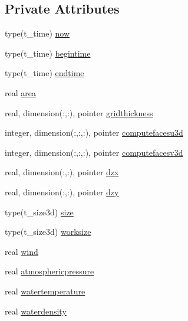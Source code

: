 \subsection*{Private Attributes}
\begin{DoxyCompactItemize}
\item 
type(t\+\_\+time) \mbox{\hyperlink{structmoduleoil_1_1t__external_a5f4b27cf96bcde31445e4983923d03b3}{now}}
\item 
type(t\+\_\+time) \mbox{\hyperlink{structmoduleoil_1_1t__external_a290d5e8747987992b0b1e4456e4d6925}{begintime}}
\item 
type(t\+\_\+time) \mbox{\hyperlink{structmoduleoil_1_1t__external_a17940b1642fb0e3377ba0e292f72ad5c}{endtime}}
\item 
real \mbox{\hyperlink{structmoduleoil_1_1t__external_aa7f8e6e2f4f35995c55819561957f356}{area}}
\item 
real, dimension(\+:,\+:), pointer \mbox{\hyperlink{structmoduleoil_1_1t__external_a727833936225962307a6a21d220c86c4}{gridthickness}}
\item 
integer, dimension(\+:,\+:,\+:), pointer \mbox{\hyperlink{structmoduleoil_1_1t__external_a5f99e02a295e8838de91a65d3ab4ea5b}{computefacesu3d}}
\item 
integer, dimension(\+:,\+:,\+:), pointer \mbox{\hyperlink{structmoduleoil_1_1t__external_a6e5ce4a1a03b16ea13bcbb2910c3d2cb}{computefacesv3d}}
\item 
real, dimension(\+:,\+:), pointer \mbox{\hyperlink{structmoduleoil_1_1t__external_a90da2b437a3d07036ba1b73f725f65ad}{dzx}}
\item 
real, dimension(\+:,\+:), pointer \mbox{\hyperlink{structmoduleoil_1_1t__external_ac1f511a2fad6c8580fcb86d4549be26c}{dzy}}
\item 
type(t\+\_\+size3d) \mbox{\hyperlink{structmoduleoil_1_1t__external_a3a8d7cc9cbad33c0ed7150fc08e25325}{size}}
\item 
type(t\+\_\+size3d) \mbox{\hyperlink{structmoduleoil_1_1t__external_a0a980eba0e168520e2260efbfdb0e62f}{worksize}}
\item 
real \mbox{\hyperlink{structmoduleoil_1_1t__external_a13c5cede1f01a870c22d136bf5cb9a40}{wind}}
\item 
real \mbox{\hyperlink{structmoduleoil_1_1t__external_a8798697fe1d235264fb6be12004a8c4e}{atmosphericpressure}}
\item 
real \mbox{\hyperlink{structmoduleoil_1_1t__external_a0b91868af2f062ef056b5e4f205c20b7}{watertemperature}}
\item 
real \mbox{\hyperlink{structmoduleoil_1_1t__external_ae4b02b8ec454298583fab044f7e7a840}{waterdensity}}

\end{DoxyCompactItemize}
